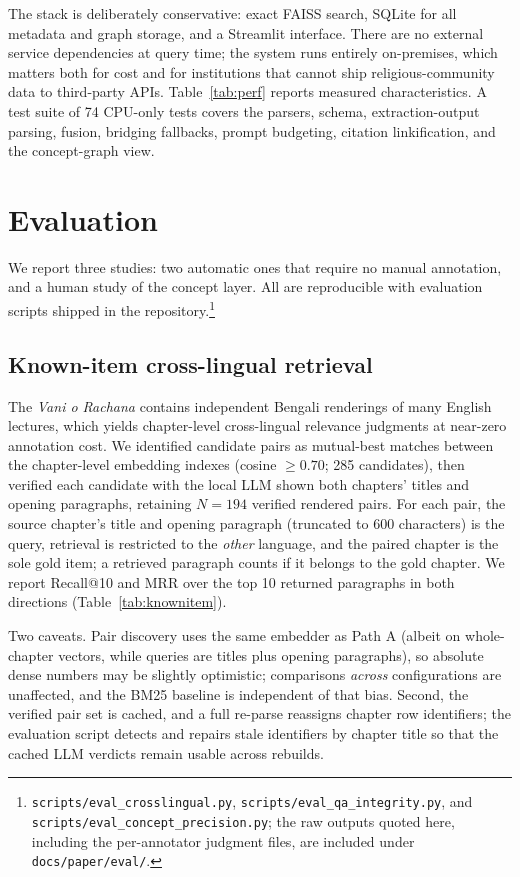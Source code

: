 \documentclass[pdflatex,sn-mathphys-num]{sn-jnl}
\begin{document}
The stack is deliberately conservative: exact FAISS search, SQLite for
all metadata and graph storage, and a Streamlit interface. There are no
external service dependencies at query time; the system runs entirely
on-premises, which matters both for cost and for institutions that
cannot ship religious-community data to third-party APIs.
Table~\ref{tab:perf} reports measured characteristics. A test suite of
74 CPU-only tests covers the parsers, schema, extraction-output
parsing, fusion, bridging fallbacks, prompt budgeting, citation
linkification, and the concept-graph view.

\section{Evaluation}
\label{sec:eval}

We report three studies: two automatic ones that require no manual
annotation, and a human study of the concept layer. All are reproducible
with evaluation scripts shipped in the
repository.\footnote{\texttt{scripts/eval\_crosslingual.py},
\texttt{scripts/eval\_qa\_integrity.py}, and
\texttt{scripts/eval\_concept\_precision.py}; the raw outputs quoted
here, including the per-annotator judgment files, are included under
\texttt{docs/paper/eval/}.}

\subsection{Known-item cross-lingual retrieval}
\label{sec:eval-knownitem}

The \emph{Vani o Rachana} contains independent Bengali renderings of many
English lectures, which yields chapter-level cross-lingual relevance
judgments at near-zero annotation cost. We identified candidate pairs as
mutual-best matches between the chapter-level embedding indexes (cosine
$\geq 0.70$; 285 candidates), then verified each candidate with the local
LLM shown both chapters' titles and opening paragraphs, retaining
$N = 194$ verified rendered pairs. For each pair, the source chapter's
title and opening paragraph (truncated to 600 characters) is the query,
retrieval is restricted to the \emph{other} language, and the paired
chapter is the sole gold item; a retrieved paragraph counts if it belongs
to the gold chapter. We report Recall@10 and MRR over the top 10 returned
paragraphs in both directions (Table~\ref{tab:knownitem}).

Two caveats. Pair discovery uses the same embedder as Path A (albeit on
whole-chapter vectors, while queries are titles plus opening paragraphs),
so absolute dense numbers may be slightly optimistic; comparisons
\emph{across} configurations are unaffected, and the BM25 baseline is
independent of that bias. Second, the verified pair set is cached, and a
full re-parse reassigns chapter row identifiers; the evaluation script
detects and repairs stale identifiers by chapter title so that the cached
LLM verdicts remain usable across rebuilds.
\end{document}
